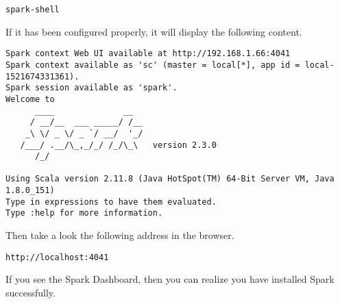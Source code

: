 \begin{lstlisting}
spark-shell
\end{lstlisting}

If it has been configured properly, it will display the following content.

\begin{lstlisting}
Spark context Web UI available at http://192.168.1.66:4041
Spark context available as 'sc' (master = local[*], app id = local-1521674331361).
Spark session available as 'spark'.
Welcome to
      ____              __
     / __/__  ___ _____/ /__
    _\ \/ _ \/ _ `/ __/  '_/
   /___/ .__/\_,_/_/ /_/\_\   version 2.3.0
      /_/
         
Using Scala version 2.11.8 (Java HotSpot(TM) 64-Bit Server VM, Java 1.8.0_151)
Type in expressions to have them evaluated.
Type :help for more information.
\end{lstlisting}

Then take a look the following address in the browser.
\begin{lstlisting}
http://localhost:4041
\end{lstlisting}

If you see the Spark Dashboard, then you can realize you have installed Spark
successfully. 